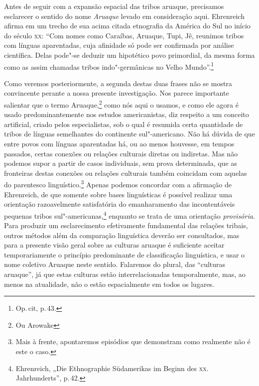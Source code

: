 Antes de seguir com a expansão espacial das tribos aruaque, precisamos
esclarecer o sentido do nome \textit{Aruaque} levado em consideração aqui.
Ehrenreich afirma em um trecho de sua acima citada etnografia da América
do Sul no início do século \textsc{xx}: ``Com nomes como Caraíbas, Aruaque, Tupi,
Jê, reunimos tribos com línguas aparentadas, cuja afinidade só pode ser
confirmada por análise científica. Delas pode"-se deduzir um hipotético
povo primordial, da mesma forma como as assim chamadas tribos
indo"-germânicas no Velho Mundo''.\footnote{Op.\,cit, p.\,43.}

Como veremos posteriormente, a segunda destas duas frases não se
mostra convincente perante a nossa presente investigação. Nos parece
importante salientar que o termo Aruaque,\footnote{Ou Arowake} como nós aqui o usamos, 
e como ele agora é usado predominantemente nos
estudos americanistas, diz respeito a um conceito artificial, criado
pelos especialistas, sob o qual é resumida certa quantidade de tribos
de línguas semelhantes do continente sul"-americano. Não há dúvida de que
entre povos com línguas aparentadas há, ou ao menos houvesse, em tempos
passados, certas conexões ou relações culturais diretas ou indiretas.
Mas não podemos supor a partir de casos individuais, sem prova
determinada, que as fronteiras destas conexões ou relações culturais
também coincidam com aquelas do parentesco linguístico.\footnote{Mais à frente, apontaremos episódios
que demonstram como realmente não é este o caso.} Apenas podemos
concordar com a afirmação de Ehrenreich, de que somente sobre bases
linguísticas é possível realizar uma orientação razoavelmente
satisfatória do emanharamento das incontentáveis pequenas tribos
sul"-americanas,\footnote{Ehrenreich, „Die Ethnographie Südamerikas im
  Beginn des \textsc{xx}. Jahrhunderts'', p.\,42.} enquanto se trata de uma
orientação \textit{provisória}. Para produzir um esclarecimento
efetivamente fundamental das relações tribais, outros métodos além da
comparação linguística deverão ser consultados, mas para a presente
visão geral sobre as culturas aruaque é suficiente aceitar
temporariamente o princípio predominante de classificação linguística, 
e usar o nome coletivo Aruaque neste
sentido. Falaremos do plural, das ``culturas aruaque'', já que estas
culturas estão interrelacionadas temporalmente, mas, ao menos na
atualidade, não o estão espacialmente em todos os lugares.

